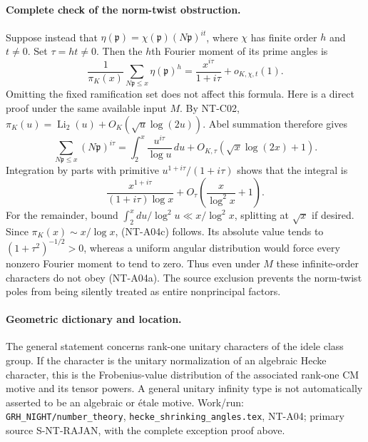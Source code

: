 \paragraph{Complete check of the norm-twist obstruction.}
Suppose instead that $\eta(\mathfrak p)=
\chi(\mathfrak p)(N\mathfrak p)^{it}$, where $\chi$ has finite order
$h$ and $t\ne0$. Set $\tau=ht\ne0$. Then the $h$th Fourier moment
of its prime angles is
\[
 \frac1{\pi_K(x)}\sum_{N\mathfrak p\le x}\eta(\mathfrak p)^h
       =\frac{x^{i\tau}}{1+i\tau}+o_{K,\chi,t}(1).       \tag{NT-A04c}
\]
Omitting the fixed ramification set does not affect this formula.
Here is a direct proof under the same available input $M$.
By NT-C02,
$\pi_K(u)=\operatorname{Li}_2(u)+O_K(\sqrt u\log(2u))$.
Abel summation therefore gives
\[
 \sum_{N\mathfrak p\le x}(N\mathfrak p)^{i\tau}
 =\int_2^x\frac{u^{i\tau}}{\log u}\,du
      +O_{K,\tau}(\sqrt x\log(2x)+1).
\]
Integration by parts with primitive
$u^{1+i\tau}/(1+i\tau)$ shows that the integral is
\[
 \frac{x^{1+i\tau}}{(1+i\tau)\log x}
           +O_\tau\!\left(\frac{x}{\log^2 x}+1\right).
\]
For the remainder, bound
$\int_2^xdu/\log^2u\ll x/\log^2x$, splitting at $\sqrt x$ if
desired. Since $\pi_K(x)\sim x/\log x$, (NT-A04c) follows.
Its absolute value tends to $(1+\tau^2)^{-1/2}>0$, whereas a
uniform angular distribution would force every nonzero Fourier
moment to tend to zero. Thus even under $M$ these infinite-order
characters do not obey (NT-A04a). The source exclusion prevents
the norm-twist poles from being silently treated as entire
nonprincipal factors.

\paragraph{Geometric dictionary and location.}
The general statement concerns rank-one unitary characters of the
idele class group. If the character is the unitary normalization
of an algebraic Hecke character, this is the Frobenius-value
distribution of the associated rank-one CM motive and its tensor
powers. A general unitary infinity type is not automatically
asserted to be an algebraic or \'{e}tale motive.
Work/run: \texttt{GRH\_NIGHT/number\_theory},
\texttt{hecke\_shrinking\_angles.tex}, NT-A04; primary source
S-NT-RAJAN, with the complete exception proof above.

